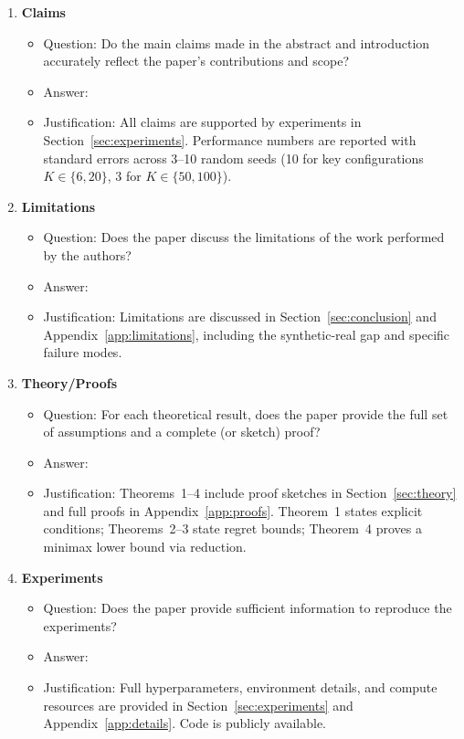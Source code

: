 \documentclass{article}
\begin{document}
\begin{enumerate}

\item {\bf Claims}
\begin{itemize}
  \item[] Question: Do the main claims made in the abstract and introduction accurately reflect the paper's contributions and scope?
  \item[] Answer: \answerYes{}
  \item[] Justification: All claims are supported by experiments in Section~\ref{sec:experiments}. Performance numbers are reported with standard errors across 3--10 random seeds (10 for key configurations $K\in\{6,20\}$, 3 for $K\in\{50,100\}$).
\end{itemize}

\item {\bf Limitations}
\begin{itemize}
  \item[] Question: Does the paper discuss the limitations of the work performed by the authors?
  \item[] Answer: \answerYes{}
  \item[] Justification: Limitations are discussed in Section~\ref{sec:conclusion} and Appendix~\ref{app:limitations}, including the synthetic-real gap and specific failure modes.
\end{itemize}

\item {\bf Theory/Proofs}
\begin{itemize}
  \item[] Question: For each theoretical result, does the paper provide the full set of assumptions and a complete (or sketch) proof?
  \item[] Answer: \answerYes{}
  \item[] Justification: Theorems~1--4 include proof sketches in Section~\ref{sec:theory} and full proofs in Appendix~\ref{app:proofs}. Theorem~1 states explicit conditions; Theorems~2--3 state regret bounds; Theorem~4 proves a minimax lower bound via reduction.
\end{itemize}

\item {\bf Experiments}
\begin{itemize}
  \item[] Question: Does the paper provide sufficient information to reproduce the experiments?
  \item[] Answer: \answerYes{}
  \item[] Justification: Full hyperparameters, environment details, and compute resources are provided in Section~\ref{sec:experiments} and Appendix~\ref{app:details}. Code is publicly available.
\end{itemize}


\end{enumerate}
\end{document}

